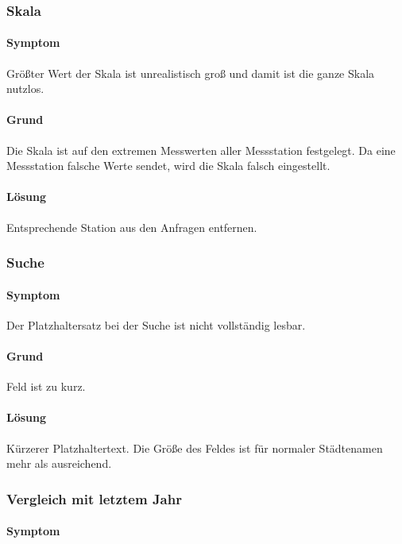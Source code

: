     \subsubsection*{Skala}
      \paragraph{Symptom}
      Größter Wert der Skala ist unrealistisch groß und damit ist die ganze Skala nutzlos.

      \paragraph{Grund}
      Die Skala ist auf den extremen Messwerten aller Messstation festgelegt. Da eine Messstation falsche Werte sendet, wird die Skala falsch eingestellt.

      \paragraph{Lösung}
      Entsprechende Station aus den Anfragen entfernen.

    \subsubsection*{Suche}
      \paragraph{Symptom}
      Der Platzhaltersatz bei der Suche ist nicht vollständig lesbar.

      \paragraph{Grund}
      Feld  ist zu kurz.

      \paragraph{Lösung}
      Kürzerer Platzhaltertext. Die Größe des Feldes ist für normaler Städtenamen mehr als ausreichend.

    \subsubsection*{Vergleich mit letztem Jahr}
      \paragraph{Symptom}

